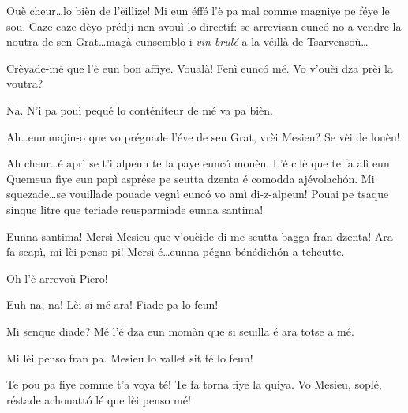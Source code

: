 \begin{drama}
\Pierluigispeaks Ouè cheur\ldots lo bièn de l'èillize! Mi eun éffé l'è pa mal comme magniye pe féye le sou. Caze caze dèyo prédji-nen avouì lo directif: se arrevisan eunc\'o no a vendre la noutra de sen Grat\ldots magà eunsemblo i \textit{vin brulé} a la véillà de Tsarvensoù\ldots

\Seurspeaks Crèyade-mé que l'è eun bon affiye. Voualà! Fenì eunc\'o mé. Vo v'ouèi dza prèi la voutra?

\Pierluigispeaks Na. N'i pa pouì pequé lo conténiteur de mé  va pa bièn.

\Seurspeaks Ah\ldots eummajin-o que vo prégnade l'éve de sen Grat, vrèi Mesieu? Se vèi de louèn!

\Pierluigispeaks Ah cheur\ldots é aprì se t'i alpeun te la paye eunc\'o mouèn. L'é cllè que te fa alì eun Quemeua fiye eun papì asprése pe seutta dzenta é comodda ajévolach\'on. Mi squezade\ldots se vouillade pouade vegnì eunc\'o vo amì di-z-alpeun! Pouai pe tsaque sinque litre que teriade reusparmiade eunna santima!

\Seurspeaks{}  Eunna santima! Mersì Mesieu que v'ouèide di-me seutta bagga fran dzenta! Ara fa scapì, mi lèi penso pi! Mersì é\ldots eunna pégna bénédich\'on a tcheutte.


\scene[-- Prospero]


\Pierluigispeaks{} Oh l'è arrevoù Piero!


\Prosperospeaks{} Euh na, na! Lèi si mé ara! Fiade pa lo feun!

\Pierluigispeaks Mi senque diade? Mé l'é dza eun momàn que si seuilla é ara totse a mé.

\Prosperospeaks Mi lèi penso fran pa. Mesieu lo vallet sit fé lo feun!


\Valletspeaks {} Te pou pa fiye comme t'a voya té! Te fa torna fiye la quiya.  Vo Mesieu, soplé, réstade achouatt\'o lé que lèi penso mé!


\end{drama}
